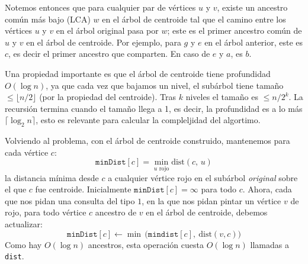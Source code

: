 Notemos entonces que para cualquier par de vértices $u$ y $v$, existe un ancestro común más bajo (LCA) $w$ en el árbol de centroide tal que el camino entre los vértices $u$ y $v$ en el árbol original pasa por $w$; este es el primer ancestro común de $u$ y $v$ en el árbol de centroide. Por ejemplo, para $g$ y $e$ en el árbol anterior, este es $c$, es decir el primer ancestro que comparten. En caso de $e$ y $a$, es $b$.

Una propiedad importante es que el árbol de centroide tiene profundidad $O(\log n)$, ya que cada vez que bajamos un nivel, el subárbol tiene tamaño $\leq \lfloor n/2 \rfloor$ (por la propiedad del centroide). Tras $k$ niveles el tamaño es $\leq n/2^k$. La recursión termina cuando el tamaño llega a 1, es decir, la profundidad es a lo más $\lceil \log_2 n \rceil$, esto es relevante para calcular la compleljidad del algortimo.

Volviendo al problema, con el árbol de centroide construido, mantenemos para cada vértice $c$:
\[
\texttt{minDist}[c] = \min_{u \text{ rojo}} \text{dist}(c,\, u)
\]
la distancia mínima desde $c$ a cualquier vértice rojo en el subárbol \emph{original} sobre el que $c$ fue centroide. Inicialmente $\texttt{minDist}[c] = \infty$ para todo $c$. Ahora, cada que nos pidan una consulta del tipo $1$, en la que nos pidan pintar un vértice $v$ de rojo, para todo vértice $c$ ancestro de $v$ en el árbol de centroide, debemos actualizar:
\[
\texttt{minDist}[c] \leftarrow \min\, \!\bigl(\texttt{mindist}[c],\ \text{dist}(v, c)\bigr)
\]
Como hay $O(\log n)$ ancestros, esta operación cuesta $O(\log n)$ llamadas a \texttt{dist}.
 

